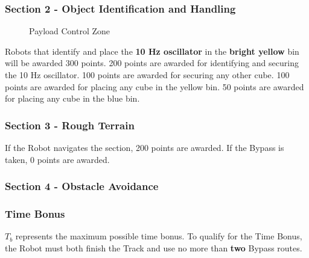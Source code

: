 \subsubsection{Section 2 - Object Identification and Handling}

\begin{figure}[H]
	\centering
	\caption{Payload Control Zone}
	\label{fig:control_zone} 
\end{figure}

Robots that identify and place the \textbf{10 Hz oscillator} in the \textbf{bright yellow} bin will be awarded 300 points. 200 points are awarded for identifying and securing the 10 Hz oscillator. 100 points are awarded for securing any other cube. 100 points are awarded for placing any cube in the yellow bin. 50 points are awarded for placing any cube in the blue bin.

\subsubsection{Section 3 - Rough Terrain}
If the Robot navigates the section, 200 points are awarded. If the Bypass is taken, 0 points are awarded.

\subsubsection{Section 4 - Obstacle Avoidance}

\subsubsection{Time Bonus}
$T_b$ represents the maximum possible time bonus. To qualify for the Time Bonus, the Robot must both finish the Track and use no more than \textbf{two} Bypass routes.

